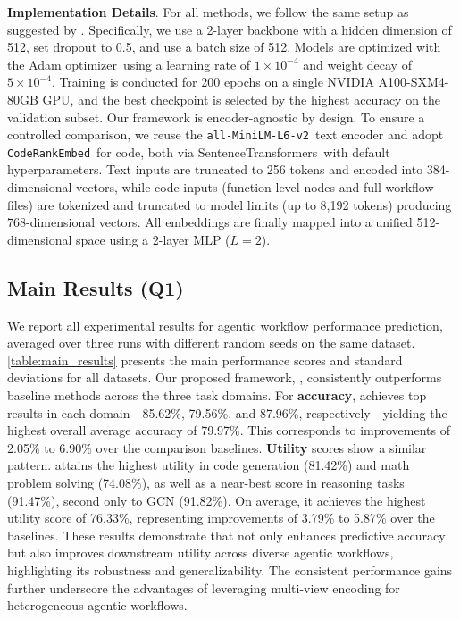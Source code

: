 \textbf{Implementation Details}. For all methods, we follow the same setup as suggested by \citet{FLORA_Bench_25}. Specifically, we use a 2-layer backbone with a hidden dimension of 512, set dropout to 0.5, and use a batch size of 512. Models are optimized with the Adam optimizer\,\citep{Adam} using a learning rate of $1 \times 10^{-4}$ and weight decay of $5 \times 10^{-4}$. Training is conducted for 200 epochs on a single NVIDIA A100-SXM4-80GB GPU, and the best checkpoint is selected by the highest accuracy on the validation subset. Our framework is encoder-agnostic by design. To ensure a controlled comparison, we reuse the \texttt{all-MiniLM-L6-v2}\,\citep{Minilm_NeurIPS_20} text encoder and adopt \texttt{CodeRankEmbed}\,\citep{CoRNStack_ICLR_25} for code, both via SentenceTransformers\,\citep{reimers-2019-sentence-bert} with default hyperparameters. Text inputs are truncated to 256 tokens and encoded into 384-dimensional vectors, while code inputs (function-level nodes and full-workflow files) are tokenized and truncated to model limits (up to 8,192 tokens) producing 768-dimensional vectors. All embeddings are finally mapped into a unified 512-dimensional space using a 2-layer $\mathrm{MLP}$ ($L=2$).



\subsection{Main Results (Q1)} \label{section:main_results}

We report all experimental results for agentic workflow performance prediction, averaged over three runs with different random seeds on the same dataset. \autoref{table:main_results} presents the main performance scores and standard deviations for all datasets. Our proposed framework, \ours{}, consistently outperforms baseline methods across the three task domains. For \textbf{accuracy}, \ours{} achieves top results in each domain---85.62\%, 79.56\%, and 87.96\%, respectively---yielding the highest overall average accuracy of 79.97\%. This corresponds to improvements of 2.05\% to 6.90\% over the comparison baselines. \textbf{Utility} scores show a similar pattern. \ours{} attains the highest utility in code generation (81.42\%) and math problem solving (74.08\%), as well as a near-best score in reasoning tasks (91.47\%), second only to GCN (91.82\%). On average, it achieves the highest utility score of 76.33\%, representing improvements of 3.79\% to 5.87\% over the baselines. These results demonstrate that \ours{} not only enhances predictive accuracy but also improves downstream utility across diverse agentic workflows, highlighting its robustness and generalizability. The consistent performance gains further underscore the advantages of leveraging multi-view encoding for heterogeneous agentic workflows.


